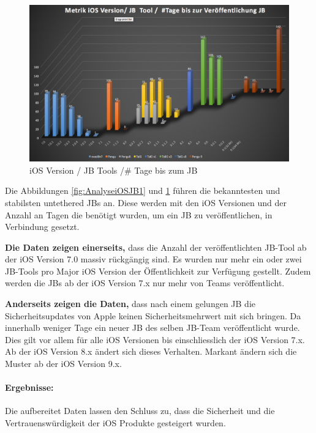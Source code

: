 \begin{figure}[htbp]
        \centering
                \includegraphics[scale=0.43]{Bilder/Frage1_2.png}
        \caption{iOS Version / JB Tools /\# Tage bis zum JB}
        \label{fig:AnalyseiOSJB2}
\end{figure}
Die Abbildungen \ref{fig:AnalyseiOSJB1} und \ref{fig:AnalyseiOSJB2} führen die bekanntesten und stabilsten untethered JBs an. Diese werden mit den iOS Versionen und der Anzahl an Tagen die benötigt wurden, um ein JB zu veröffentlichen, in Verbindung gesetzt.

\textbf{Die Daten zeigen einerseits,} dass die Anzahl der veröffentlichten JB-Tool ab der iOS Version 7.0 massiv rückgängig sind. Es wurden nur mehr ein oder zwei JB-Tools pro Major iOS Version der Öffentlichkeit zur Verfügung gestellt. Zudem werden die JBs ab der iOS Version 7.x nur mehr von Teams veröffentlicht.

\textbf{Anderseits zeigen die Daten,} dass nach einem gelungen JB die Sicherheitsupdates von Apple keinen Sicherheitsmehrwert mit sich bringen. Da innerhalb weniger Tage ein neuer JB des selben JB-Team veröffentlicht wurde. Dies gilt vor allem für alle iOS Versionen bis einschliesslich der iOS Version 7.x. Ab der iOS Version 8.x ändert sich dieses Verhalten. Markant ändern sich die Muster ab der iOS Version 9.x.

\paragraph{Ergebnisse:} Die aufbereitet Daten lassen den Schluss zu, dass die Sicherheit und die Vertrauenswürdigkeit der iOS Produkte gesteigert wurden.

